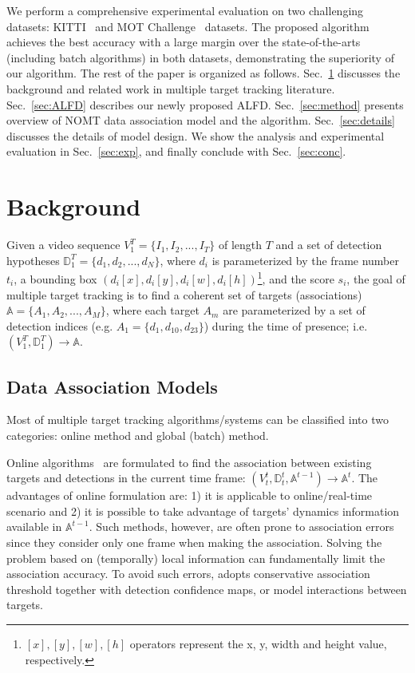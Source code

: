 \documentclass[10pt,twocolumn,letterpaper]{article}
\begin{document}
We perform a comprehensive experimental evaluation on two challenging datasets: KITTI~\cite{Geiger2012CVPR} and MOT Challenge~\cite{MOTChallenge} datasets. The proposed algorithm achieves the best accuracy with a large margin over the state-of-the-arts (including batch algorithms) in both datasets, demonstrating the superiority of our algorithm. The rest of the paper is organized as follows. Sec.~\ref{sec:background} discusses the background and related work in multiple target tracking literature. Sec.~\ref{sec:ALFD} describes our newly proposed ALFD. Sec.~\ref{sec:method} presents overview of NOMT data association model and the algorithm. Sec.~\ref{sec:details} discusses the details of model design. We show the analysis and experimental evaluation in Sec.~\ref{sec:exp}, and finally conclude with Sec.~\ref{sec:conc}.


\section{Background}
\label{sec:background}

Given a video sequence $V_1^T = \{I_1, I_2, ..., I_T\}$ of length $T$ and a set of detection hypotheses $\mathbb{D}_1^T = \{d_1, d_2, ..., d_N\}$, where $d_i$ is parameterized by the frame number $t_i$, a bounding box $(d_i[x], d_i[y], d_i[w], d_i[h])$\footnote{$[x], [y], [w], [h]$ operators represent the x, y, width and height value, respectively.}, and the score $s_i$, 
the goal of multiple target tracking is to find a coherent set of targets (associations) $\mathbb{A} = \{ A_1, A_2, ..., A_M\}$, where each target $A_m$ are parameterized by a set of detection indices (e.g. $A_1 = \{d_1, d_{10}, d_{23}\}$)  during the time of presence; i.e. $(V_1^T, \mathbb{D}_1^T) \rightarrow \mathbb{A}$. 

\subsection{Data Association Models}

Most of multiple target tracking algorithms/systems can be classified into two categories: online method and global (batch) method. 

Online algorithms~\cite{BreitensteinICCV09,choi_pami13,Ess_PAMI_09,Khan_PAMI_05,pellegrini2009you} are formulated to find the association between existing targets and detections in the current time frame: $(V_t^t, \mathbb{D}_t^t, \mathbb{A}^{t-1}) \rightarrow \mathbb{A}^t$. The advantages of online formulation are: 1) it is applicable to online/real-time scenario and 2) it is possible to take advantage of targets' dynamics information available in $\mathbb{A}^{t-1}$. Such methods, however, are often prone to association errors since they consider only one frame when making the association. 
Solving the problem based on (temporally) local information can fundamentally limit the association accuracy. 
To avoid such errors, \cite{BreitensteinICCV09} adopts conservative association threshold together with detection confidence maps, or \cite{choi_pami13,Khan_PAMI_05,pellegrini2009you} model interactions between targets. 
\end{document}
